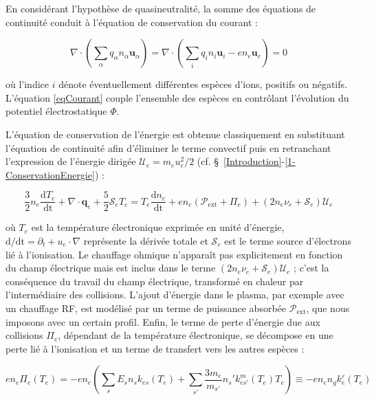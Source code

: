 \begin{refsection}
En considérant l'hypothèse de quasineutralité, la
somme des équations de continuité conduit à l'équation de conservation du courant :

\begin{equation}
\label{eqCourant}
\nabla\cdot(\sum_\alpha q_\alpha n_\alpha\mathbf
u_\alpha)=\nabla\cdot(\sum_iq_in_i\mathbf{u}_i-en_e\mathbf{u}_e)=0
\end{equation}

où l'indice $i$ dénote éventuellement différentes espèces d'ions, positifs ou
négatifs.
L'équation \eqref{eqCourant} couple l'ensemble des espèces en contrôlant
l'évolution du potentiel électrostatique $\Phi$.

L'équation de conservation de l'énergie est obtenue classiquement en substituant
l'équation de continuité afin d'éliminer le terme convectif puis en retranchant
l'expression de l'énergie dirigée $\mathcal{U}_e=m_eu_e^2/2$ (cf.
\S~\ref{Introduction}-\ref{1-ConservationEnergie}) :

\begin{equation}
\label{3-eqTemperature}
\frac{3}{2}n_e\frac{\text{d}T_e}{\text{dt}}+\nabla\cdot\mathbf
q_e + \frac{5}{2}\mathcal{S}_e T_e = T_e\frac{\text{d}n_e}{\text{dt}}+ 
en_e\left(\mathcal{P}_\text{ext}+\Pi_e\right)+(2n_e\nu_e+\mathcal{S}_e)\mathcal{U}_e
\end{equation}

où $T_e$ est la température électronique exprimée en unité d'énergie,
$\text{d/dt}=\partial_t+u_e\cdot\nabla$ représente la dérivée totale et
$\mathcal{S}_e$ est le terme source d'électrons lié à l'ionisation. 
Le chauffage ohmique n'apparaît pas explicitement en fonction du champ
électrique mais est inclus dans le terme
$(2n_e\nu_e+\mathcal{S}_e)\mathcal{U}_e$ ; c'est la
conséquence du travail du champ électrique, transformé en chaleur par
l'intermédiaire des collisions. L'ajout d'énergie dans le plasma, par exemple
avec un chauffage RF, est modélisé par un terme
de puissance absorbée $\mathcal{P}_\text{ext}$, que nous imposons avec un
certain profil. Enfin, le terme de perte d'énergie due aux collisions $\Pi_e$,
dépendant de la température électronique, se décompose en une perte lié à
l'ionisation et un terme de transfert vers les autres espèces :

\begin{equation}
en_e\Pi_e(T_e)
=-en_e\left(\sum_{s}E_sn_sk_{es}(T_e)+\sum_{s'}\frac{3m_e}{m_{s'}}n_s'k^m_{es'}(T_e)T_e\right)
\equiv-en_en_gk^\varepsilon_e(T_e)
\end{equation}



\end{refsection}
